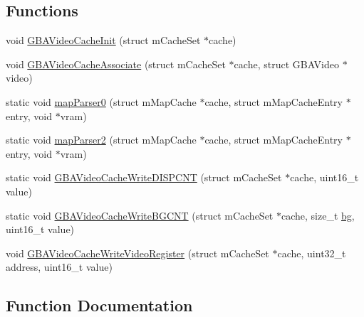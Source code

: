\subsection*{Functions}
\begin{DoxyCompactItemize}
\item 
void \mbox{\hyperlink{gba_2renderers_2cache-set_8c_a19731671a169a93b76c08671ee5ae0d9}{G\+B\+A\+Video\+Cache\+Init}} (struct m\+Cache\+Set $\ast$cache)
\item 
void \mbox{\hyperlink{gba_2renderers_2cache-set_8c_a79fa3e44bb9733bf6fc6cc35d3759e53}{G\+B\+A\+Video\+Cache\+Associate}} (struct m\+Cache\+Set $\ast$cache, struct G\+B\+A\+Video $\ast$video)
\item 
static void \mbox{\hyperlink{gba_2renderers_2cache-set_8c_a51851b87bae33cac8355b4eedb326a96}{map\+Parser0}} (struct m\+Map\+Cache $\ast$cache, struct m\+Map\+Cache\+Entry $\ast$entry, void $\ast$vram)
\item 
static void \mbox{\hyperlink{gba_2renderers_2cache-set_8c_a6bf5dc58738132b1eb88fc80abf14f2e}{map\+Parser2}} (struct m\+Map\+Cache $\ast$cache, struct m\+Map\+Cache\+Entry $\ast$entry, void $\ast$vram)
\item 
static void \mbox{\hyperlink{gba_2renderers_2cache-set_8c_ac92c0800c27ae258899fe58d4d279f78}{G\+B\+A\+Video\+Cache\+Write\+D\+I\+S\+P\+C\+NT}} (struct m\+Cache\+Set $\ast$cache, uint16\+\_\+t value)
\item 
static void \mbox{\hyperlink{gba_2renderers_2cache-set_8c_a1299d4a8657975bf62ba1d6e26410a7d}{G\+B\+A\+Video\+Cache\+Write\+B\+G\+C\+NT}} (struct m\+Cache\+Set $\ast$cache, size\+\_\+t \mbox{\hyperlink{rpng2-x_8c_a808fa6d3573a86afa3ba7698a65b1ef6}{bg}}, uint16\+\_\+t value)
\item 
void \mbox{\hyperlink{gba_2renderers_2cache-set_8c_adb3ad772576f4872cf21d2ad0867830b}{G\+B\+A\+Video\+Cache\+Write\+Video\+Register}} (struct m\+Cache\+Set $\ast$cache, uint32\+\_\+t address, uint16\+\_\+t value)
\end{DoxyCompactItemize}


\subsection{Function Documentation}
\mbox{\label{gba_2renderers_2cache-set_8c_a79fa3e44bb9733bf6fc6cc35d3759e53}} 
